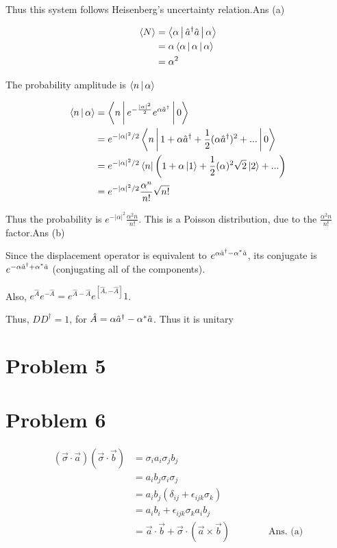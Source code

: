 \documentclass[12pt]{article}
\begin{document}
Thus this system follows Heisenberg's uncertainty relation.\hfill Ans (a)

\begin{align*}
\Braket{N} &= \Braket{\alpha|{\hat a^\dagger}\hat a|\alpha}\\
&=\alpha\Braket{\alpha|\alpha|\alpha}\\
&=\alpha^2
\end{align*}

The probability amplitude is $\Braket{n|\alpha}$

\begin{align*}
\Braket{n|\alpha} &= \Braket{n|e^{-\frac{\left|\alpha\right|^2}{2}}e^{\alpha{\hat a^\dagger}}|0}\\
&=e^{-|\alpha|^2/2}\Braket{n|1 + \alpha{\hat a^\dagger}+\frac12(\alpha{\hat a^\dagger})^2 + ...|0}\\
&=e^{-|\alpha|^2/2}\Bra{n}\left(1 + \alpha\Ket{1}+\frac12(\alpha)^2\sqrt2\Ket{2} +...\right)\\
&= e^{-|\alpha|^2/2}\frac{\alpha^n}{n!}\sqrt{n!}
\end{align*}

Thus the probability is $e^{-|\alpha|^2}\frac{\alpha^2n}{n!}$. This is a Poisson distribution, due to the $\frac{\alpha^2n}{n!}$ factor.\hfill Ans (b)

Since the displacement operator is equivalent to $e^{\alpha{\hat a^\dagger}-\alpha^*\hat a}$, its conjugate is $e^{-\alpha{\hat a^\dagger}+\alpha^*\hat a}$ (conjugating all of the components).

Also, $e^{\hat A}e^{-\hat A}=e^{\hat A-\hat A}e^{[\hat A,-\hat A]}1$.

Thus, $DD^\dagger = 1$, for $\hat A=\alpha{\hat a^\dagger}-\alpha^*\hat a$. Thus it is unitary
\section*{Problem 5}
\section*{Problem 6} 
\begin{align*}
(\vec \sigma\cdot \vec a)(\vec \sigma \cdot \vec b) &= \sigma_ia_i\sigma_jb_j\\
&=a_ib_j\sigma_i\sigma_j\\
&=a_ib_j(\delta_{ij}+\epsilon_{ijk}\sigma_k)\\
&=a_ib_i + \epsilon_{ijk}\sigma_ka_ib_j\\
&=\vec a \cdot\vec b + \vec \sigma\cdot(\vec a \times \vec b)\qquad\qquad\text{Ans. (a)}
\end{align*}
\end{document}

